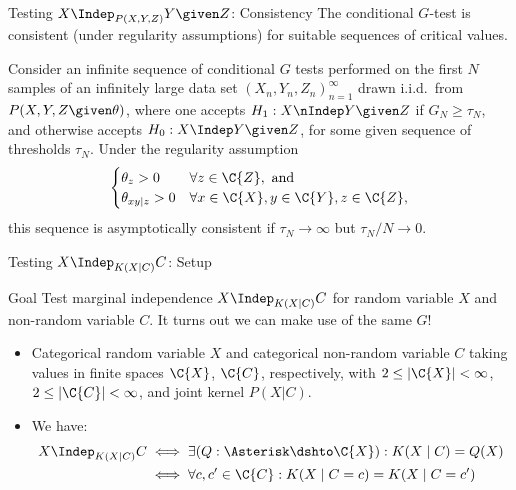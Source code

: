 \begin{frame}{Testing $X \Indep_{P(X,Y,Z)} Y \given Z$: Consistency}
  The conditional $G$-test is consistent (under regularity assumptions) for suitable sequences of critical values.
  \begin{Cor}
  Consider an infinite sequence of conditional $G$ tests performed on the first $N$ samples of an infinitely large
  data set $(X_n,Y_n,Z_n)_{n=1}^\infty$ drawn i.i.d.\ from $P(X,Y,Z \given \theta)$,
  where one accepts $H_1 : X \nIndep Y \given Z$ if $G_N \ge \tau_N$, and otherwise accepts $H_0 : X \Indep Y \given Z$,
  for some given sequence of thresholds $\tau_N$.
  Under the regularity assumption 
\begin{equation*}
  \begin{cases}
    \theta_z > 0 & \forall z \in \C{Z}, \text{ and}\\
    \theta_{xy|z} > 0 & \forall x \in \C{X}, y\in \C{Y}, z\in \C{Z},
  \end{cases}
\end{equation*}
  this sequence is asymptotically consistent if $\tau_N \to \infty$ but $\tau_N / N \to 0$.
  \end{Cor}
\end{frame}


\begin{frame}{Testing $X \Indep_{K(X|C)} C$: Setup}
  \begin{block}{Goal}
    Test marginal independence $X \Indep_{K(X|C)} C$ for random variable $X$ and non-random variable $C$.
    It turns out we can make use of the same $G$!
  \end{block}
  \begin{itemize}
    \item Categorical random variable $X$ and categorical non-random variable $C$ taking values in finite spaces $\C{X}$, $\C{C}$,
respectively, with $2 \le |\C{X}| < \infty$, $2 \le |\C{C}| < \infty$, and joint kernel $P(X|C)$.
    \item We have:
      \begin{equation*}\begin{split}
        X \Indep_{K(X|C)} C
        & \iff \exists (Q : \Asterisk \dshto \C{X}) : K(X\mid C) = Q(X) \\
        & \iff \forall c,c' \in \C{C}: K(X\mid C=c) = K(X\mid C=c') 
      \end{split}\end{equation*}
  \end{itemize}
\end{frame}

